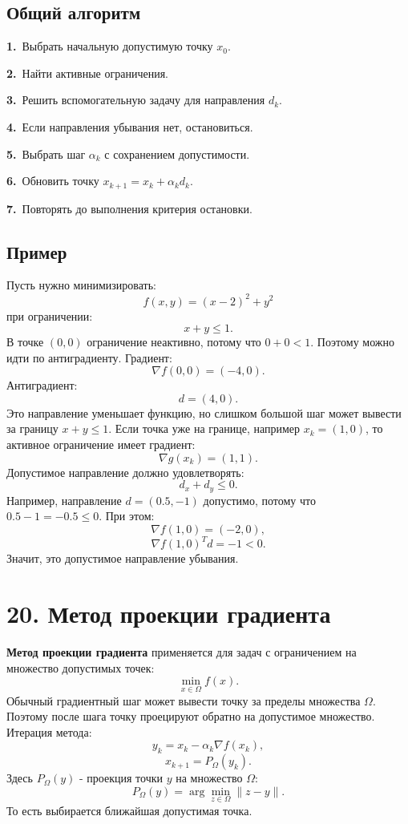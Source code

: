 \documentclass[12pt,a4paper]{article}
\begin{document}
\subsection{Общий алгоритм}
\noindent\textbf{1.}\ Выбрать начальную допустимую точку $x_0$.\par
\noindent\textbf{2.}\ Найти активные ограничения.\par
\noindent\textbf{3.}\ Решить вспомогательную задачу для направления $d_k$.\par
\noindent\textbf{4.}\ Если направления убывания нет, остановиться.\par
\noindent\textbf{5.}\ Выбрать шаг $\alpha_k$ с сохранением допустимости.\par
\noindent\textbf{6.}\ Обновить точку $x_{k+1}=x_k+\alpha_kd_k$.\par
\noindent\textbf{7.}\ Повторять до выполнения критерия остановки.\par
\subsection{Пример}
Пусть нужно минимизировать:
\[
f(x,y)=(x-2)^2+y^2
\]
при ограничении:
\[
x+y\le 1.
\]
В точке $(0,0)$ ограничение неактивно, потому что $0+0<1$. Поэтому можно идти по антиградиенту. Градиент:
\[
\nabla f(0,0)=(-4,0).
\]
Антиградиент:
\[
d=(4,0).
\]
Это направление уменьшает функцию, но слишком большой шаг может вывести за границу $x+y\le 1$.
Если точка уже на границе, например $x_k=(1,0)$, то активное ограничение имеет градиент:
\[
\nabla g(x_k)=(1,1).
\]
Допустимое направление должно удовлетворять:
\[
d_x+d_y\le 0.
\]
Например, направление $d=(0.5,-1)$ допустимо, потому что $0.5-1=-0.5\le 0$. При этом:
\[
\nabla f(1,0)=(-2,0),
\]
\[
\nabla f(1,0)^Td=-1<0.
\]
Значит, это допустимое направление убывания.

\section{20. Метод проекции градиента}
\textbf{Метод проекции градиента} применяется для задач с ограничением на множество допустимых точек:
\[
\min_{x\in \Omega} f(x).
\]
Обычный градиентный шаг может вывести точку за пределы множества $\Omega$. Поэтому после шага точку проецируют обратно на допустимое множество.
Итерация метода:
\[
y_k=x_k-\alpha_k\nabla f(x_k),
\]
\[
x_{k+1}=P_\Omega(y_k).
\]
Здесь $P_\Omega(y)$ - проекция точки $y$ на множество $\Omega$:
\[
P_\Omega(y)=\arg\min_{z\in \Omega}\|z-y\|.
\]
То есть выбирается ближайшая допустимая точка.
\end{document}
